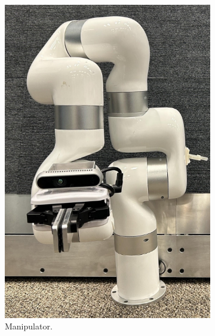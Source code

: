\documentclass[runningheads,a4paper]{llncs}
\begin{document}
\begin{figure}[tbp]
\begin{subfigure}[t]{0.24\linewidth}
		\includegraphics[width=\linewidth]{images/component_arm.png}
		\caption{Manipulator.}
	\end{subfigure}
	\begin{subfigure}[t]{0.24\linewidth}

\end{subfigure}
\end{figure}
\end{document}
